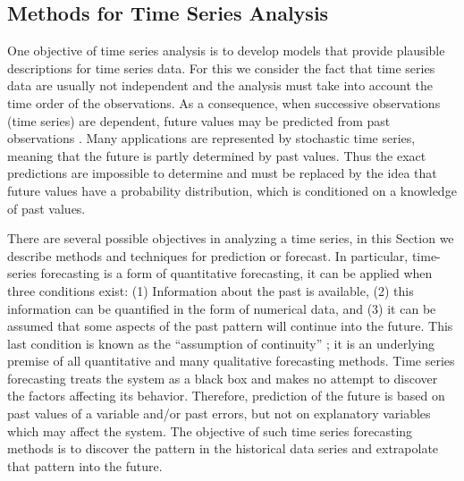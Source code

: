 \subsection{Methods for Time Series Analysis}
\label{Sec:MethodsTSA}

One objective of time series analysis is to develop models that provide plausible descriptions for time series data. For this we consider the fact that time series data are usually not independent and the analysis must take into account the time order of the observations. As a consequence, when successive observations (time series) are dependent, future values may be predicted from past observations \cite{Mills2019}. Many applications are represented by stochastic time series, meaning that the future is partly determined by past values. Thus the exact predictions are impossible to determine and must be replaced by the idea that future values have a probability distribution, which is conditioned on a knowledge of past values. 

There are several possible objectives in analyzing a time series, in this Section we describe methods and techniques for prediction or forecast. %
%
In particular, time-series forecasting is a form of quantitative forecasting, it can be applied when three conditions exist: (1) Information about the past is available, (2) this information can be quantified in the form of numerical data, and (3) it can be assumed that some aspects of the past pattern will continue into the future. This last condition is known as the ``assumption of continuity'' \cite{Makridakis2008}; it is an underlying premise of all quantitative and many qualitative forecasting methods. Time series forecasting treats the system as a black box and makes no attempt to discover the factors affecting its behavior. Therefore, prediction of the future is based on past values of a variable and/or past errors, but not on explanatory variables which may affect the system. The objective of such time series forecasting methods is to discover the pattern in the historical data series and extrapolate that pattern into the future. 

